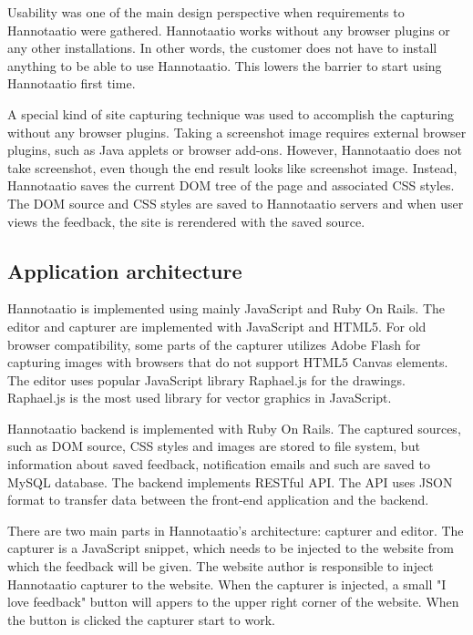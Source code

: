 \documentclass[english,12pt,a4paper,pdftex]{article}
\begin{document}
Usability was one of the main design perspective when requirements to Hannotaatio were gathered. Hannotaatio works without any browser plugins or any other installations. In other words, the customer does not have to install anything to be able to use Hannotaatio. This lowers the barrier to start using Hannotaatio first time.

A special kind of site capturing technique was used to accomplish the capturing without any browser plugins. Taking a screenshot image requires external browser plugins, such as Java applets or browser add-ons. However, Hannotaatio does not take screenshot, even though the end result looks like screenshot image. Instead, Hannotaatio saves the current \ac{DOM} tree of the page and associated \ac{CSS} styles. The \ac{DOM} source and \ac{CSS} styles are saved to Hannotaatio servers and when user views the feedback, the site is rerendered with the saved source.

\subsection{Application architecture}

Hannotaatio is implemented using mainly JavaScript and Ruby On Rails. The editor and capturer are implemented with JavaScript and HTML5. For old browser compatibility, some parts of the capturer utilizes Adobe Flash for capturing images with browsers that do not support HTML5 Canvas elements. The editor uses popular JavaScript library Raphael.js for the drawings. Raphael.js is the most used library for vector graphics in JavaScript.

Hannotaatio backend is implemented with Ruby On Rails. The captured sources, such as \ac{DOM} source, \ac{CSS} styles and images are stored to file system, but information about saved feedback, notification emails and such are saved to MySQL database. The backend implements RESTful \ac{API}. The \ac{API} uses JSON format to transfer data between the front-end application and the backend.

There are two main parts in Hannotaatio's architecture: capturer and editor. The capturer is a JavaScript snippet, which needs to be injected to the website from which the feedback will be given. The website author is responsible to inject Hannotaatio capturer to the website. When the capturer is injected, a small "I love feedback" button will appers to the upper right corner of the website. When the button is clicked the capturer start to work. 
\end{document}
